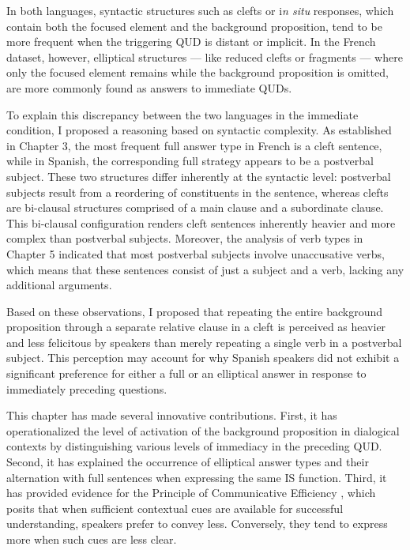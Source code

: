 In both languages, syntactic structures such as clefts or i\textit{n situ} responses, which contain both the focused element and the background proposition, tend to be more frequent when the triggering QUD is distant or implicit. In the French dataset, however, elliptical structures — like reduced clefts or fragments — where only the focused element remains while the background proposition is omitted, are more commonly found as answers to immediate QUDs.

To explain this discrepancy between the two languages in the immediate condition, I proposed a reasoning based on syntactic complexity. As established in Chapter 3, the most frequent full answer type in French is a cleft sentence, while in Spanish, the corresponding full strategy appears to be a postverbal subject. These two structures differ inherently at the syntactic level: postverbal subjects result from a reordering of constituents in the sentence, whereas clefts are bi-clausal structures comprised of a main clause and a subordinate clause. This bi-clausal configuration renders cleft sentences inherently heavier and more complex than postverbal subjects.
Moreover, the analysis of verb types in Chapter 5 indicated that most postverbal subjects involve unaccusative verbs, which means that these sentences consist of just a subject and a verb, lacking any additional arguments.

Based on these observations, I proposed that repeating the entire background proposition through a separate relative clause in a cleft is perceived as heavier and less felicitous by speakers than merely repeating a single verb in a postverbal subject. This perception may account for why Spanish speakers did not exhibit a significant preference for either a full or an elliptical answer in response to immediately preceding questions.

This chapter has made several innovative contributions. First, it has operationalized the level of activation of the background proposition in dialogical contexts by distinguishing various levels of immediacy in the preceding QUD. Second, it has explained the occurrence of elliptical answer types and their alternation with full sentences when expressing the same IS function. Third, it has provided evidence for the Principle of Communicative Efficiency \parencite{Levshina_2022}, which posits that when sufficient contextual cues are available for successful understanding, speakers prefer to convey less. Conversely, they tend to express more when such cues are less clear.



